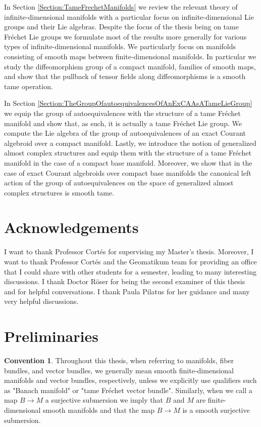 \documentclass[12pt,a4paper]{article}
\theoremstyle{plain}
\theoremstyle{definition}
\newtheorem{convention}[theorem]{Convention}
\begin{document}
In Section \ref{Section:TameFrechetManifolds} we review the relevant theory of infinite-dimensional manifolds with a particular focus on infinite-dimensional Lie groups and their Lie algebras. Despite the focus of the thesis being on tame Fréchet Lie groups we formulate most of the results more generally for various types of infinite-dimensional manifolds.
We particularly focus on manifolds consisting of smooth maps between finite-dimensional manifolds. In particular we study the diffeomorphism group of a compact manifold, families of smooth maps, and show that the pullback of tensor fields along diffeomorphisms is a smooth tame operation.

In Section \ref{Section:TheGroupOfautoequivalencesOfAnExCAAsATameLieGroup} we equip the group of autoequivalences with the structure of a tame Fréchet manifold and show that, as such, it is actually a tame Fréchet Lie group.
We compute the Lie algebra of the group of autoequivalences of an exact Courant algebroid over a compact manifold.
Lastly, we introduce the notion of generalized almost complex structures and equip them with the structure of a tame Fréchet manifold in the case of a compact base manifold. Moreover, we show that in the case of exact Courant algebroids over compact base manifolds the canonical left action of the group of autoequivalences on the space of generalized almost complex structures is smooth tame.






\section*{Acknowledgements}
I want to thank Professor Cortés for supervising my Master's thesis. Moreover, I want to thank Professor Cortés and the Geomatikum team for providing an office that I could share with other students for a semester, leading to many interesting discussions.
I thank Doctor Röser for being the second examiner of this thesis and for helpful conversations.
I thank Paula Pilatus for her guidance and many very helpful discussions.








\section*{Preliminaries}
\begin{convention}
Throughout this thesis, when referring to manifolds, fiber bundles, and vector bundles, we generally mean smooth finite-dimensional manifolds and vector bundles, respectively, unless we explicitly use qualifiers such as "Banach manifold" or "tame Fréchet vector bundle". Similarly, when we call a map $B\to M$ a surjective submersion we imply that $B$ and $M$ are finite-dimensional smooth manifolds and that the map $B\to M$ is a smooth surjective submersion.
\end{convention}
\end{document}
